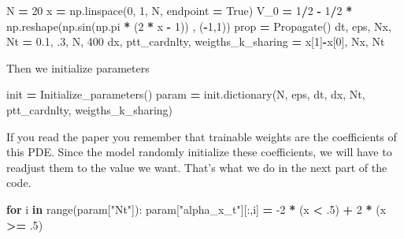 \documentclass[openany,twoside]{book}
\newenvironment{Shaded}{\begin{snugshade}}{\end{snugshade}}
\newcommand{\BuiltInTok}[1]{#1}
\newcommand{\ControlFlowTok}[1]{\textcolor[rgb]{0.13,0.29,0.53}{\textbf{#1}}}
\newcommand{\DecValTok}[1]{\textcolor[rgb]{0.00,0.00,0.81}{#1}}
\newcommand{\FloatTok}[1]{\textcolor[rgb]{0.00,0.00,0.81}{#1}}
\newcommand{\KeywordTok}[1]{\textcolor[rgb]{0.13,0.29,0.53}{\textbf{#1}}}
\newcommand{\NormalTok}[1]{#1}
\newcommand{\OperatorTok}[1]{\textcolor[rgb]{0.81,0.36,0.00}{\textbf{#1}}}
\newcommand{\StringTok}[1]{\textcolor[rgb]{0.31,0.60,0.02}{#1}}
\newcommand{\VariableTok}[1]{\textcolor[rgb]{0.00,0.00,0.00}{#1}}
\begin{document}
\begin{Shaded}
\begin{Highlighting}[]
\NormalTok{N }\OperatorTok{=} \DecValTok{20}
\NormalTok{x }\OperatorTok{=}\NormalTok{ np.linspace(}\DecValTok{0}\NormalTok{, }\DecValTok{1}\NormalTok{, N, endpoint }\OperatorTok{=} \VariableTok{True}\NormalTok{)}
\NormalTok{V_0 }\OperatorTok{=} \DecValTok{1}\OperatorTok{/}\DecValTok{2} \OperatorTok{-} \DecValTok{1}\OperatorTok{/}\DecValTok{2} \OperatorTok{*}\NormalTok{ np.reshape(np.sin(np.pi }\OperatorTok{*}\NormalTok{ (}\DecValTok{2} \OperatorTok{*}\NormalTok{ x }\OperatorTok{-} \DecValTok{1}\NormalTok{)) , (}\OperatorTok{-}\DecValTok{1}\NormalTok{,}\DecValTok{1}\NormalTok{))}
\NormalTok{prop }\OperatorTok{=}\NormalTok{ Propagate()}
\NormalTok{dt, eps, Nx, Nt }\OperatorTok{=} \FloatTok{0.1}\NormalTok{, }\FloatTok{.3}\NormalTok{,  N, }\DecValTok{400}
\NormalTok{dx, ptt_cardnlty, weigths_k_sharing }\OperatorTok{=}\NormalTok{ x[}\DecValTok{1}\NormalTok{]}\OperatorTok{-}\NormalTok{x[}\DecValTok{0}\NormalTok{], Nx, Nt}
\end{Highlighting}
\end{Shaded}

Then we initialize parameters

\begin{Shaded}
\begin{Highlighting}[]
\NormalTok{init }\OperatorTok{=}\NormalTok{ Initialize_parameters()}
\NormalTok{param }\OperatorTok{=}\NormalTok{ init.dictionary(N, eps, dt, dx, Nt, ptt_cardnlty, weigths_k_sharing)}
\end{Highlighting}
\end{Shaded}

If you read the paper you remember that trainable weights are the coefficients of this PDE. Since the model randomly initialize these coefficients, we will have to readjust them to the value we want. That's what we do in the next part of the code.

\begin{Shaded}
\begin{Highlighting}[]
\ControlFlowTok{for}\NormalTok{ i }\KeywordTok{in} \BuiltInTok{range}\NormalTok{(param[}\StringTok{"Nt"}\NormalTok{]):}
\NormalTok{	param[}\StringTok{"alpha_x_t"}\NormalTok{][:,i] }\OperatorTok{=} \DecValTok{-2} \OperatorTok{*}\NormalTok{ (x }\OperatorTok{<} \FloatTok{.5}\NormalTok{) }\OperatorTok{+} \DecValTok{2} \OperatorTok{*}\NormalTok{ (x }\OperatorTok{>=} \FloatTok{.5}\NormalTok{)}
\end{Highlighting}
\end{Shaded}
\end{document}
